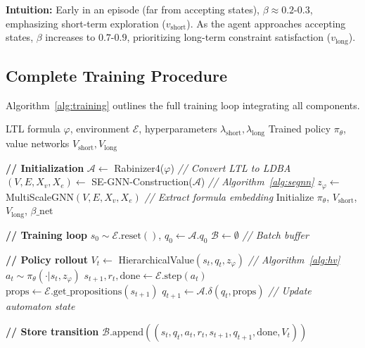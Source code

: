 \documentclass[journal]{IEEEtran}
\begin{document}
\textbf{Intuition:} Early in an episode (far from accepting states), $\beta \approx 0.2$-$0.3$, emphasizing short-term exploration ($v_{\text{short}}$). As the agent approaches accepting states, $\beta$ increases to $0.7$-$0.9$, prioritizing long-term constraint satisfaction ($v_{\text{long}}$).

\subsection{Complete Training Procedure}

Algorithm~\ref{alg:training} outlines the full training loop integrating all components.

\begin{algorithm}[htbp]
\caption{HiLTL Training with Multi-Scale RL}
\label{alg:training}
\begin{algorithmic}[1]
\REQUIRE LTL formula $\varphi$, environment $\mathcal{E}$, hyperparameters $\lambda_{\text{short}}, \lambda_{\text{long}}$
\ENSURE Trained policy $\pi_\theta$, value networks $V_{\text{short}}, V_{\text{long}}$

\STATE \textbf{// Initialization}
\STATE $\mathcal{A} \gets$ Rabinizer4($\varphi$) \hfill \textit{// Convert LTL to LDBA}
\STATE $(V, E, X_v, X_e) \gets$ SE-GNN-Construction($\mathcal{A}$) \hfill \textit{// Algorithm~\ref{alg:segnn}}
\STATE $z_\varphi \gets$ MultiScaleGNN$(V, E, X_v, X_e)$ \hfill \textit{// Extract formula embedding}
\STATE Initialize $\pi_\theta$, $V_{\text{short}}$, $V_{\text{long}}$, $\beta\_\text{net}$

\STATE \textbf{// Training loop}
	\STATE $s_0 \sim \mathcal{E}.\text{reset}()$, $q_0 \gets \mathcal{A}.q_0$
	\STATE $\mathcal{B} \gets \emptyset$ \hfill \textit{// Batch buffer}
    
		\STATE \textbf{// Policy rollout}
		\STATE $V_t \gets$ HierarchicalValue$(s_t, q_t, z_\varphi)$ \hfill \textit{// Algorithm~\ref{alg:hv}}
		\STATE $a_t \sim \pi_\theta(\cdot | s_t, z_\varphi)$
		\STATE $s_{t+1}, r_t, \text{done} \gets \mathcal{E}.\text{step}(a_t)$
		\STATE $\text{props} \gets \mathcal{E}.\text{get\_propositions}(s_{t+1})$
		\STATE $q_{t+1} \gets \mathcal{A}.\delta(q_t, \text{props})$ \hfill \textit{// Update automaton state}
        
		\STATE \textbf{// Store transition}
		\STATE $\mathcal{B}.\text{append}((s_t, q_t, a_t, r_t, s_{t+1}, q_{t+1}, \text{done}, V_t))$
        

\end{algorithmic}
\end{algorithm}
\end{document}

